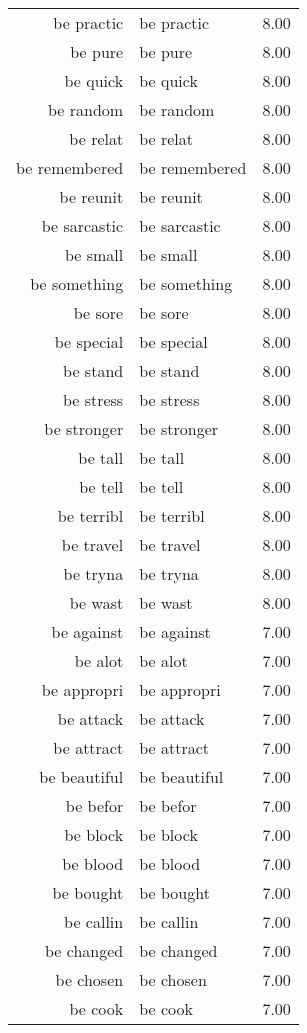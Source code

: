 \begin{table}[ht]
\begin{tabular}{rlr}
  be practic & be practic & 8.00 \\ 
  be pure & be pure & 8.00 \\ 
  be quick & be quick & 8.00 \\ 
  be random & be random & 8.00 \\ 
  be relat & be relat & 8.00 \\ 
  be remembered & be remembered & 8.00 \\ 
  be reunit & be reunit & 8.00 \\ 
  be sarcastic & be sarcastic & 8.00 \\ 
  be small & be small & 8.00 \\ 
  be something & be something & 8.00 \\ 
  be sore & be sore & 8.00 \\ 
  be special & be special & 8.00 \\ 
  be stand & be stand & 8.00 \\ 
  be stress & be stress & 8.00 \\ 
  be stronger & be stronger & 8.00 \\ 
  be tall & be tall & 8.00 \\ 
  be tell & be tell & 8.00 \\ 
  be terribl & be terribl & 8.00 \\ 
  be travel & be travel & 8.00 \\ 
  be tryna & be tryna & 8.00 \\ 
  be wast & be wast & 8.00 \\ 
  be against & be against & 7.00 \\ 
  be alot & be alot & 7.00 \\ 
  be appropri & be appropri & 7.00 \\ 
  be attack & be attack & 7.00 \\ 
  be attract & be attract & 7.00 \\ 
  be beautiful & be beautiful & 7.00 \\ 
  be befor & be befor & 7.00 \\ 
  be block & be block & 7.00 \\ 
  be blood & be blood & 7.00 \\ 
  be bought & be bought & 7.00 \\ 
  be callin & be callin & 7.00 \\ 
  be changed & be changed & 7.00 \\ 
  be chosen & be chosen & 7.00 \\ 
  be cook & be cook & 7.00 \\ 

\end{tabular}
\end{table}
